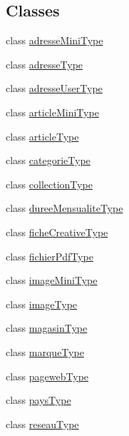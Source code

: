 \subsection*{Classes}
\begin{DoxyCompactItemize}
\item 
class \hyperlink{class_acme_group_1_1_labo_bundle_1_1_form_1_1adresse_mini_type}{adresse\+Mini\+Type}
\item 
class \hyperlink{class_acme_group_1_1_labo_bundle_1_1_form_1_1adresse_type}{adresse\+Type}
\item 
class \hyperlink{class_acme_group_1_1_labo_bundle_1_1_form_1_1adresse_user_type}{adresse\+User\+Type}
\item 
class \hyperlink{class_acme_group_1_1_labo_bundle_1_1_form_1_1article_mini_type}{article\+Mini\+Type}
\item 
class \hyperlink{class_acme_group_1_1_labo_bundle_1_1_form_1_1article_type}{article\+Type}
\item 
class \hyperlink{class_acme_group_1_1_labo_bundle_1_1_form_1_1categorie_type}{categorie\+Type}
\item 
class \hyperlink{class_acme_group_1_1_labo_bundle_1_1_form_1_1collection_type}{collection\+Type}
\item 
class \hyperlink{class_acme_group_1_1_labo_bundle_1_1_form_1_1duree_mensualite_type}{duree\+Mensualite\+Type}
\item 
class \hyperlink{class_acme_group_1_1_labo_bundle_1_1_form_1_1fiche_creative_type}{fiche\+Creative\+Type}
\item 
class \hyperlink{class_acme_group_1_1_labo_bundle_1_1_form_1_1fichier_pdf_type}{fichier\+Pdf\+Type}
\item 
class \hyperlink{class_acme_group_1_1_labo_bundle_1_1_form_1_1image_mini_type}{image\+Mini\+Type}
\item 
class \hyperlink{class_acme_group_1_1_labo_bundle_1_1_form_1_1image_type}{image\+Type}
\item 
class \hyperlink{class_acme_group_1_1_labo_bundle_1_1_form_1_1magasin_type}{magasin\+Type}
\item 
class \hyperlink{class_acme_group_1_1_labo_bundle_1_1_form_1_1marque_type}{marque\+Type}
\item 
class \hyperlink{class_acme_group_1_1_labo_bundle_1_1_form_1_1pageweb_type}{pageweb\+Type}
\item 
class \hyperlink{class_acme_group_1_1_labo_bundle_1_1_form_1_1pays_type}{pays\+Type}
\item 
class \hyperlink{class_acme_group_1_1_labo_bundle_1_1_form_1_1reseau_type}{reseau\+Type}

\end{DoxyCompactItemize}
